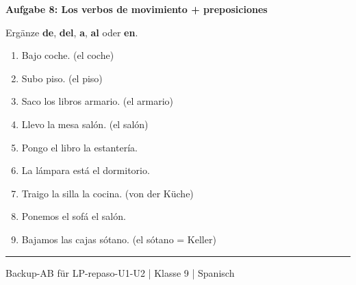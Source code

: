 \documentclass[a4paper,11pt]{article}
\newcommand{\luecke}[1]{\underline{\hspace{#1}}}
\newcommand{\punktebox}[1]{\hfill\fbox{\small\textcolor{mittelgrau}{\_\_\_\,/\,#1}}}
\newenvironment{aufgabe}[2]{%
    \vspace{3mm}
    \noindent\textbf{\color{spanisch}Aufgabe #1: #2}
    \vspace{1mm}
    \par
}{\vspace{2mm}}
\begin{document}

\begin{aufgabe}{8}{Los verbos de movimiento + preposiciones \punktebox{9}}

Ergänze \textbf{de}, \textbf{del}, \textbf{a}, \textbf{al} oder \textbf{en}.

\vspace{2mm}
\begin{enumerate}[itemsep=2mm]
    \item Bajo \luecke{1.5cm} coche. (el coche)
    \item Subo \luecke{1.5cm} piso. (el piso)
    \item Saco los libros \luecke{1.5cm} armario. (el armario)
    \item Llevo la mesa \luecke{1.5cm} salón. (el salón)
    \item Pongo el libro \luecke{1.5cm} la estantería.
    \item La lámpara está \luecke{1.5cm} el dormitorio.
    \item Traigo la silla \luecke{1.5cm} la cocina. (von der Küche)
    \item Ponemos el sofá \luecke{1.5cm} el salón.
    \item Bajamos las cajas \luecke{1.5cm} sótano. (el sótano = Keller)
\end{enumerate}
\end{aufgabe}

\vspace{3mm}
\noindent{}

\vfill

\noindent\rule{\textwidth}{0.4pt}
{\small\color{mittelgrau} Backup-AB für LP-repaso-U1-U2 | Klasse 9 | Spanisch}
\end{document}
